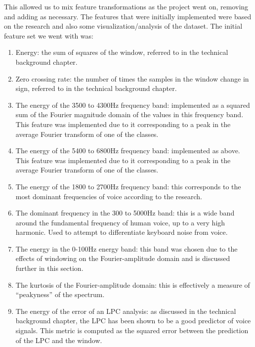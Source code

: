 \documentclass[ %
                    author={Sam Phippen},
                supervisor={Dr. Rafal Bogacz},
                     title={Real time voice activity detectors in noisy personal computing environments},
                  subtitle={},
                    degree={MEng},
                      year={2012} ]{thesis}
\begin{document}
This allowed us to mix feature transformations as the project went on, removing
and adding as necessary. The features that were initially implemented were
based on the research and also some visualization/analysis of the dataset. The
initial feature set we went with was:

\begin{enumerate}
    \item Energy: the sum of squares of the window, referred to in the technical
        background chapter.

    \item Zero crossing rate: the number of times the samples in the window
        change in sign, referred to in the technical background chapter.

    \item The energy of the 3500 to 4300Hz frequency band: implemented as a
        squared sum of the Fourier magnitude domain of the values in this
        frequency band. This feature was implemented due to it corresponding to
        a peak in the average Fourier transform of one of the classes.

    \item The energy of the 5400 to 6800Hz frequency band: implemented as
        above. This feature was implemented due to it corresponding to a peak
        in the average Fourier transform of one of the classes.

    \item The energy of the 1800 to 2700Hz frequency band: this corresponds to
        the most dominant frequencies of voice according to the research.

    \item The dominant frequency in the 300 to 5000Hz band: this is a wide band
        around the fundamental frequency of human voice, up to a very high
        harmonic. Used to attempt to differentiate keyboard noise from voice.

    \item The energy in the 0-100Hz energy band: this band was chosen due to
        the effects of windowing on the Fourier-amplitude domain and is
        discussed further in this section.

    \item The kurtosis of the Fourier-amplitude domain: this is effectively a
        measure of ``peakyness'' of the spectrum.

    \item The energy of the error of an LPC analysis: as discussed in the
        technical background chapter, the LPC has been shown to be a good
        predictor of voice signals. This metric is computed as the squared
        error between the prediction of the LPC and the window.


\end{enumerate}
\end{document}
